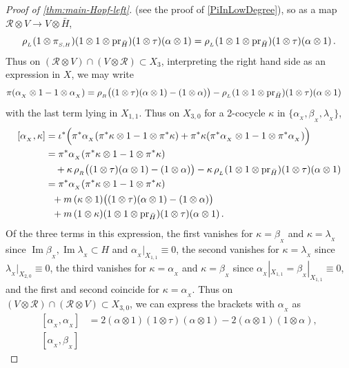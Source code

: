 \documentclass[11pt]{amsart}
\numberwithin{equation}{section}
\DeclareMathOperator{\Ima}{Im}
\newcommand{\X}{_X}
\newcommand{\alphax}{\alpha_{\X}}
\newcommand{\betax}{\beta_{\X}}
\newcommand{\lambdax}{\lambda_{\X}}
\newcommand{\gammax}{\kappa} %
\newcommand{\pr}{ {\rm{pr}} }%
\newcommand{\R}{\mathcal{R}}
\renewcommand{\_}[1]{\mbox{$_{\left( #1 \right)}$}}
\newcommand{\ot}{\otimes}
\begin{document}
{\begin{proof}[Proof of \cref{thm:main-Hopf-left}]
(see the proof of \cref{PiInLowDegree}),
so as a map $\R\ot V\rightarrow V\ot \bar H$,
$$\rho_{_L}(1\ot \pi_{_{S,H}} ) (1\ot 1\ot \pr_{\bar H}) (1\ot \tau)(\alpha\ot 1)
= \rho_{_L} (1\ot 1\ot \pr_{\bar H}) (1\ot \tau)(\alpha\ot 1)
\, .
$$
Thus on $(\R\ot V)\cap (V\ot \R)\subset X_3$,
interpreting the right hand side as an expression in $X$,
we may write
$$
\begin{aligned}
\pi(\alphax\ot 1  - 1\ot \alphax) 
&=
\rho_{_R} 
\big(
(1\ot \tau)(\alpha\ot 1) -(1\ot \alpha) \big) 
-\rho_{_L} (1\ot 1\ot \pr_{\bar H})
(1\ot \tau)(\alpha\ot 1) 
\, 
\end{aligned}
$$
with the last term lying in $X_{1,1}$.
Thus on $X_{3,0}$
for a 2-cocycle $\gammax$ in $\{\alphax,\betax,\lambdax\}$,
 $$
 \begin{aligned}
   [\alphax, \gammax]
  &=
   \iota^*\Big(\pi^*\alphax (\pi^*\gammax\ot 1 - 1\ot \pi^*\gammax) 
   +
   \pi^*\gammax (\pi^*\alphax\ot 1 - 1\ot \pi^*\alphax) \Big) 
 \\    &=
\pi^*\alphax (\pi^*\gammax\ot 1 - 1\ot \pi^*\gammax) 
\\    &\ \ \
+
   \gammax \, 
\rho_{_R} 
\big(
(1\ot \tau)(\alpha\ot 1) -(1\ot \alpha) \big) 
-\gammax\, \rho_{_L}  (1\ot 1\ot \pr_{\bar H})
(1\ot \tau)(\alpha\ot 1) 
\\    &=
\pi^*\alphax (\pi^*\gammax\ot 1 - 1\ot \pi^*\gammax) 
\\ & \ \
+m\, (\gammax\ot 1) 
\big((1\ot \tau)(\alpha\ot 1) -(1\ot \alpha) \big) 
\\ & \ \
+m\, (1 \ot\gammax) (1\ot 1\ot \pr_{\bar H}) (1\ot \tau)(\alpha\ot 1) 
 \, . 
\end{aligned}
$$
Of the three terms in this expression, 
the first vanishes for
$\gammax=\betax$ and $\gammax=\lambdax$
since $\Ima \betax, \Ima \lambdax \subset H$ and
$\alphax|_{X_{1,1} } \equiv 0 $,
the second vanishes for $\gammax=\lambdax$
since $\lambdax|_{X_{2,0}}\equiv 0$,
the third vanishes for $\gammax=\alphax$ and $\gammax=\betax$
since $\alphax|_{X_{1,1} }= \betax|_{X_{1,1} } \equiv 0 $,
and the first and second coincide for $\gammax=\alphax$.
Thus
on $(V\ot \R)\cap (\R\ot V)\subset X_{3,0}$,
we can express the brackets with $\alphax$ as
$$
\begin{aligned}
  [ \alphax , \alphax ]
  &=
2 (\alpha\ot 1)(1\ot \tau)(\alpha\ot 1) 
-2(\alpha\ot 1)(1\ot \alpha),
\\ 
[\alphax, \betax]

\end{aligned}$$
\end{proof}}
\end{document}
